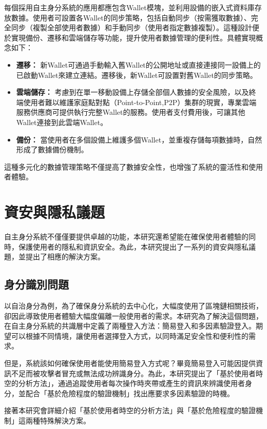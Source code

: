 每個採用自主身分系統的應用都應包含Wallet模塊，並利用設備的嵌入式資料庫存放數據。使用者可設置各Wallet的同步策略，包括自動同步（按需獲取數據）、完全同步（複製全部使用者數據）和手動同步（使用者指定數據複製）。這種設計便於實現備份、遷移和雲端儲存等功能，提升使用者數據管理的便利性。具體實現概念如下：
\begin{itemize}
  \item \textbf{遷移：} 新Wallet可通過手動輸入舊Wallet的公開地址或直接連接同一設備上的已啟動Wallet來建立連結。遷移後，新Wallet可設置對舊Wallet的同步策略。
  \item \textbf{雲端儲存：} 考慮到在單一移動設備上存儲全部個人數據的安全風險，以及終端使用者難以維護家庭點對點（Point-to-Point,P2P）集群的現實，專業雲端服務供應商可提供執行完整Wallet的服務。使用者支付費用後，可讓其他 Wallet連接到此雲端Wallet。
  \item \textbf{備份：} 當使用者在多個設備上維護多個Wallet，並重複存儲每項數據時，自然形成了數據備份機制。
\end{itemize}
這種多元化的數據管理策略不僅提高了數據安全性，也增強了系統的靈活性和使用者體驗。
\section{資安與隱私議題}
自主身分系統不僅僅要提供卓越的功能，本研究還希望能在確保使用者體驗的同時，保護使用者的隱私和資訊安全。為此，本研究提出了一系列的資安與隱私議題，並提出了相應的解決方案。
\subsection{身分識別問題}
以自治身分為例，為了確保身分系統的去中心化，大幅度使用了區塊鏈相關技術，卻因此導致使用者體驗大幅度偏離一般使用者的需求。本研究為了解決這個問題，在自主身分系統的共識層中定義了兩種登入方法：簡易登入和多因素驗證登入。期望可以根據不同情境，讓使用者選擇登入方式，以同時滿足安全性和便利性的需求。

但是，系統該如何確保使用者能使用簡易登入方式呢？畢竟簡易登入可能因提供資訊不足而被攻擊者冒充或無法成功辨識身分。為此，本研究提出了「基於使用者時空的分析方法」，通過追蹤使用者每次操作時夾帶或產生的資訊來辨識使用者身分，並配合「基於危險程度的驗證機制」找出應要求多因素驗證的時機。

接著本研究會詳細介紹「基於使用者時空的分析方法」與「基於危險程度的驗證機制」這兩種特殊解決方案。
